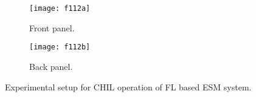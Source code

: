 \begin{figure}[ht!]
\begin{subfigure}{1\columnwidth}
\begin{center}
\texttt{[image: f112a]}
\end{center}
\caption{Front panel.}
\label{ch5_f112a}
\end{subfigure}
\begin{subfigure}{1\columnwidth}
\begin{center}
\texttt{[image: f112b]}
\end{center}
\caption{Back panel.}
\label{ch5_f112b}
\end{subfigure}
\caption{Experimental setup for CHIL operation of FL based ESM system.}
\label{ch5_f112}
\end{figure}
